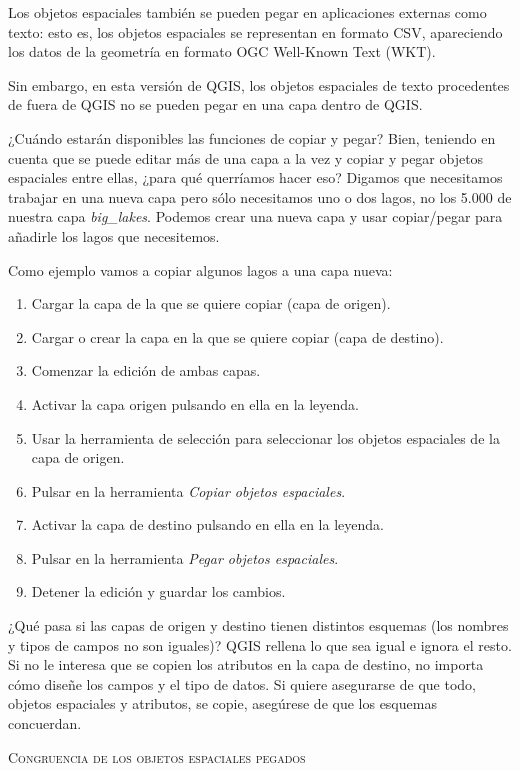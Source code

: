 Los objetos espaciales también se pueden pegar en aplicaciones externas como texto: esto es, los objetos espaciales se representan en formato CSV, apareciendo los datos de la geometría en formato OGC Well-Known Text (WKT).

Sin embargo, en esta versión de QGIS, los objetos espaciales de texto procedentes de fuera de QGIS no se pueden pegar en una capa dentro de QGIS.

¿Cuándo estarán disponibles las funciones de copiar y pegar? Bien, teniendo en cuenta que se puede editar más de una capa a la vez y copiar y pegar objetos espaciales entre ellas, ¿para qué querríamos hacer eso? Digamos que necesitamos trabajar en una nueva capa pero sólo necesitamos uno o dos lagos, no los 5.000 de nuestra capa \textsl{big\_lakes}. Podemos crear una nueva capa y usar copiar/pegar para añadirle los lagos que necesitemos.

Como ejemplo vamos a copiar algunos lagos a una capa nueva:

\begin{enumerate}
\item Cargar la capa de la que se quiere copiar (capa de origen).
\item Cargar o crear la capa en la que se quiere copiar (capa de destino).
\item Comenzar la edición de ambas capas.
\item Activar la capa origen pulsando en ella en la leyenda.
\item Usar la herramienta de selección para seleccionar los objetos espaciales de la capa de origen.
\item Pulsar en la herramienta \textsl{Copiar objetos espaciales}.
\item Activar la capa de destino pulsando en ella en la leyenda.
\item Pulsar en la herramienta \textsl{Pegar objetos espaciales}.
\item Detener la edición y guardar los cambios.
\end{enumerate}

¿Qué pasa si las capas de origen y destino tienen distintos esquemas (los nombres y tipos de campos no son iguales)? QGIS rellena lo que sea igual e ignora el resto. Si no le interesa que se copien los atributos en la capa de destino, no importa cómo diseñe los campos y el tipo de datos. Si quiere asegurarse de que todo, objetos espaciales y atributos, se copie, asegúrese de que los esquemas concuerdan.

\begin{Tip}[h]\caption{\textsc{Congruencia de los objetos espaciales pegados}}
\end{Tip}

